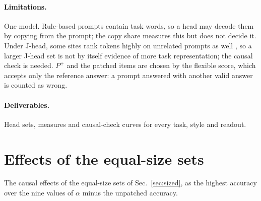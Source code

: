 \documentclass[11pt,a4paper]{article}
\begin{document}
\paragraph{Limitations.} One model. Rule-based prompts contain task words, so a head may decode them by copying from the prompt; the copy share measures this but does not decide it. Under J-head, some sites rank tokens highly on unrelated prompts as well \citep[Sec.~3.6]{merlo2026headjlens}, so a larger J-head set is not by itself evidence of more task representation; the causal check is needed. $P^{+}$ and the patched items are chosen by the flexible score, which accepts only the reference answer: a prompt answered with another valid answer is counted as wrong.


\paragraph{Deliverables.} Head sets, measures and causal-check curves for every task, style and readout.




\clearpage
\appendix
\section{Effects of the equal-size sets}\label{app:sized}
The causal effects of the equal-size sets of Sec.~\ref{sec:sized}, as the highest accuracy over the nine values of $\alpha$ minus the unpatched accuracy.

\begin{table}[H]
\centering\footnotesize

\caption{Equal-size sets, E1 rule, first causal check: causal effect of the $N$ highest-ranked heads with means of their own style, as in Table~\ref{tab:effects-simple}, over the nine values of $\alpha$. L: Logit-head, J: J-head. --: set not formed (fewer than $N$ heads match on any prompt).}
\label{tab:sized-readouts}
\end{table}

\begin{table}[H]
\centering\footnotesize

\caption{Equal-size sets, E1 rule, second causal check, as Table~\ref{tab:sized-readouts}. Items: the wrongly answered 1-shot prompts patched; the baseline is 0.}
\label{tab:sized-readouts-wrong}
\end{table}

\begin{table}[H]
\centering\footnotesize

\caption{Equal-size sets, E1 rule, first causal check: causal effect of the control mean at the sets of Table~\ref{tab:sized-readouts}.}
\label{tab:sized-readouts-control}
\end{table}
\end{document}

